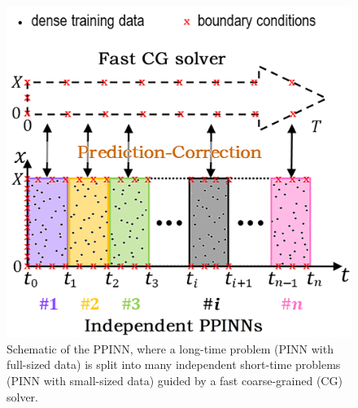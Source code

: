 \documentclass[conference,compsoc]{IEEEtran}
\begin{document}
\begin{figure}
  \centering
  \includegraphics[scale=0.15]{figures/Figure2a.png}
  \caption{Schematic of the PPINN, where a long-time problem (PINN with full-sized data) is split into many independent short-time problems (PINN with small-sized data) guided by a fast coarse-grained (CG) solver.\cite{meng2020ppinn}}
\end{figure}
\end{document}
